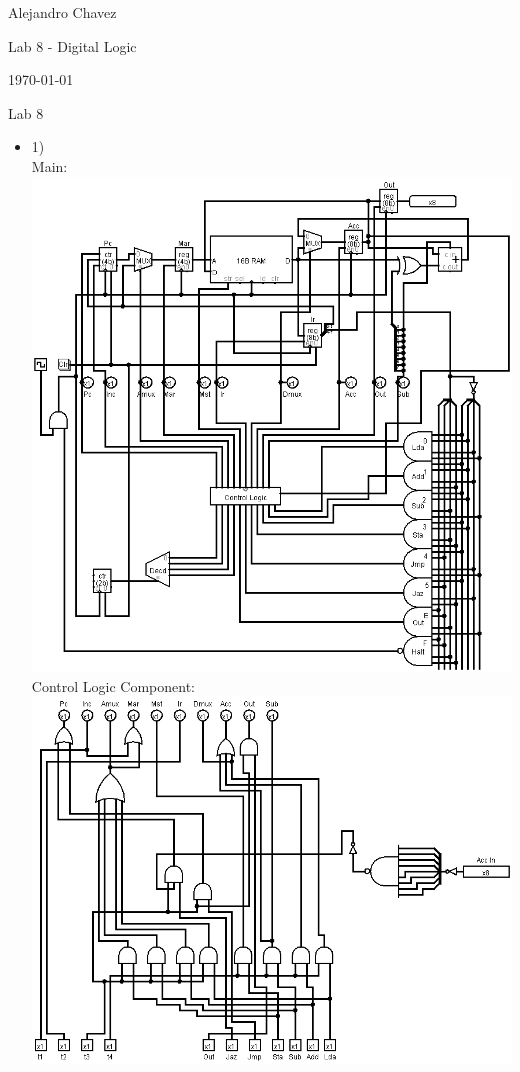 \documentclass{article}
\begin{document}
\hfill Alejandro Chavez

\hfill Lab 8 - Digital Logic

\hfill \today\\

\begin{center}\begin{large}Lab 8\end{large}\end{center}
\begin{itemize}
	\item
		1)\\
    Main:\\
    \includegraphics[scale=0.5]{lab8-main.png}\\
    Control Logic Component:\\
    \includegraphics[scale=0.5]{lab8-clc.png}\\

\end{itemize}
\end{document}
